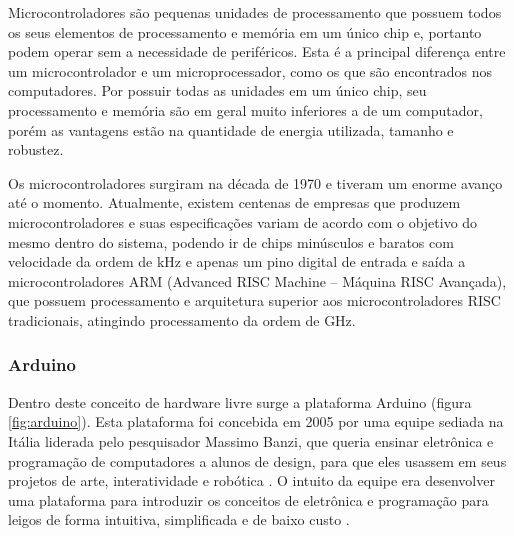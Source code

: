 Microcontroladores são pequenas unidades de processamento que possuem todos os seus elementos de processamento e memória em um único chip e, portanto podem operar sem a necessidade de periféricos. Esta é a principal diferença entre um microcontrolador e um microprocessador, como os que são encontrados nos computadores. Por possuir todas as unidades em um único chip, seu processamento e memória são em geral muito inferiores a de um computador, porém as vantagens estão na quantidade de energia utilizada, tamanho e robustez. 

Os microcontroladores surgiram na década de 1970 e tiveram um enorme avanço até o momento. Atualmente, existem centenas de empresas que produzem microcontroladores e suas especificações variam de acordo com o objetivo do mesmo dentro do sistema, podendo ir de chips minúsculos e baratos com velocidade da ordem de kHz e apenas um pino digital de entrada e saída a microcontroladores ARM (Advanced RISC Machine – Máquina RISC Avançada), que possuem processamento e arquitetura superior aos microcontroladores RISC tradicionais, atingindo processamento da ordem de GHz. 

\subsubsection{Arduino}

Dentro deste conceito de hardware livre surge a plataforma Arduino (figura \ref{fig:arduino}). Esta plataforma foi concebida em 2005 por uma equipe sediada na Itália liderada pelo pesquisador Massimo Banzi, que queria ensinar eletrônica e programação de computadores a alunos de design, para que eles usassem em seus projetos de arte, interatividade e robótica \citep{arduino-araujo}. O intuito da equipe era desenvolver uma plataforma para introduzir os conceitos de eletrônica e programação para leigos de forma intuitiva, simplificada e de baixo custo \citep{arduino-barrett}.

